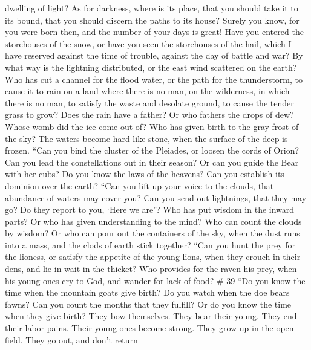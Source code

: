 dwelling of light? As for darkness, where is its place, 
that you should take it to its bound, that you should discern the paths
to its house?  Surely you know, for you were born then,
and the number of your days is great!  Have you entered
the storehouses of the snow, or have you seen the storehouses of the
hail,  which I have reserved against the time of trouble,
against the day of battle and war?  By what way is the
lightning distributed, or the east wind scattered on the earth?
 Who has cut a channel for the flood water, or the path
for the thunderstorm,  to cause it to rain on a land
where there is no man, on the wilderness, in which there is no man,
 to satisfy the waste and desolate ground, to cause the
tender grass to grow?  Does the rain have a father? Or
who fathers the drops of dew?  Whose womb did the ice
come out of? Who has given birth to the gray frost of the sky?
 The waters become hard like stone, when the surface of
the deep is frozen.  ``Can you bind the cluster of the
Pleiades, or loosen the cords of Orion?  Can you lead the
constellations out in their season? Or can you guide the Bear with her
cubs?  Do you know the laws of the heavens? Can you
establish its dominion over the earth?  ``Can you lift up
your voice to the clouds, that abundance of waters may cover you?
 Can you send out lightnings, that they may go? Do they
report to you, `Here we are'?  Who has put wisdom in the
inward parts? Or who has given understanding to the mind?
 Who can count the clouds by wisdom? Or who can pour out
the containers of the sky,  when the dust runs into a
mass, and the clods of earth stick together?  ``Can you
hunt the prey for the lioness, or satisfy the appetite of the young
lions,  when they crouch in their dens, and lie in wait
in the thicket?  Who provides for the raven his prey,
when his young ones cry to God, and wander for lack of food? \# 39
 ``Do you know the time when the mountain goats give
birth? Do you watch when the doe bears fawns?  Can you
count the months that they fulfill? Or do you know the time when they
give birth?  They bow themselves. They bear their young.
They end their labor pains.  Their young ones become
strong. They grow up in the open field. They go out, and don't return
